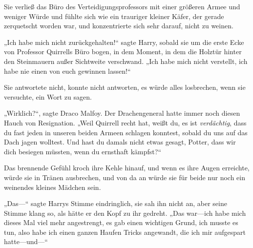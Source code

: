 \later

Sie verließ das Büro des Verteidigungsprofessors mit einer größeren Armee und weniger Würde und fühlte sich wie ein trauriger kleiner Käfer, der gerade zerquetscht worden war, und konzentrierte sich sehr darauf, nicht zu weinen.

„Ich habe mich nicht zurückgehalten!“ sagte Harry, sobald sie um die erste Ecke von Professor Quirrells Büro bogen, in dem Moment, in dem die Holztür hinter den Steinmauern außer Sichtweite verschwand. „Ich habe mich nicht verstellt, ich habe nie einen von euch gewinnen lassen!“

Sie antwortete nicht, konnte nicht antworten, es würde alles losbrechen, wenn sie versuchte, ein Wort zu sagen.

„Wirklich?“, sagte Draco Malfoy. Der Drachengeneral hatte immer noch diesen Hauch von Resignation. „Weil Quirrell recht hat, weißt du, es ist \emph{verdächtig}, dass du fast jeden in unseren beiden Armeen schlagen konntest, sobald du uns auf das Dach jagen wolltest. Und hast du damals nicht etwas gesagt, Potter, dass wir dich besiegen müssten, wenn du ernsthaft kämpfst?“

Das brennende Gefühl kroch ihre Kehle hinauf, und wenn es ihre Augen erreichte, würde sie in Tränen ausbrechen, und von da an würde sie für beide nur noch ein weinendes kleines Mädchen sein.

„Das—“ sagte Harrys Stimme eindringlich, sie sah ihn nicht an, aber seine Stimme klang so, als hätte er den Kopf zu ihr gedreht. „Das war—ich habe mich dieses Mal viel mehr angestrengt, es gab einen wichtigen Grund, ich musste es tun, also habe ich einen ganzen Haufen Tricks angewandt, die ich mir aufgespart hatte—und—“

